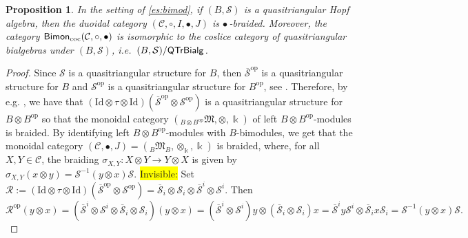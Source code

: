 \documentclass[nosumlimits,twoside]{amsart}
\newtheorem{proposition}[proposition]{\sc Proposition}
\theoremstyle{definition}
\theoremstyle{remark}
\newenvironment{invisible}{{\noindent\sc \colorbox{yellow}{Invisible:}\;}\color{gray}}{\medskip}
\newcommand{\id}{\mathrm{Id}}
\newcommand{\Cc}{\mathcal{C}}
\newcommand{\mm}{\mathfrak{M}}
\newcommand{\Rr}{\mathcal{R}}
\newcommand{\Ss}{\mathcal{S}}
\newcommand{\ot}{\otimes}
\def\cBimon{{\sf Bimon}_{\mathrm{coc}}}
\def\QTrBialg{{\sf QTrBialg}}
\newcommand{\op}{\mathrm{op}}
\begin{document}
\begin{proposition}
\label{pro:bimoncoc}
In the setting of \cref{es:bimod}, if $(B,\Ss)$ is a quasitriangular Hopf algebra, then the duoidal category $(\mathcal{C}, \circ, I, \bullet, J)$ is $\bullet$\,-braided. Moreover, the category  $\cBimon(\Cc,\circ,\bullet)$ is isomorphic to the coslice category of quasitriangular bialgebras under $(B,\Ss)$, i.e.\ $(B,\Ss)/\QTrBialg$.  
\end{proposition}

\begin{proof}
Since $\Ss$ is a quasitriangular structure for $B$, then $\overline{\Ss}^\op$ is a quasitriangular structure for $B$ and $\Ss^\op$ is a quasitriangular structure for $B^\op$, see \cite[Exercise 2.1.3]{Majid-book}. Therefore, by e.g. \cite[Theorem 2.2]{Chen-quasi}, we have that $(\id\ot\tau\ot\id)(\overline{\Ss}^\op\ot\Ss^\op)$ is a quasitriangular structure for $B\ot B^\op$ so that the monoidal category $(_{B\ot B^\op}\mm,\ot,\Bbbk)$ of left $B\ot B^\op$-modules is braided. By identifying left $B\ot B^\op$-modules with $B$-bimodules, we get that the monoidal category $(\Cc,\bullet,J)=({}_B\mathfrak{M}_B,\ot_\Bbbk,\Bbbk)$ is braided, where, for all $X,Y\in\Cc$, the braiding  $\sigma_{X,Y}:X\ot Y\to Y\ot X$ is given by $\sigma_{X,Y}(x\ot y)=\Ss^{-1}(y \ot x)\Ss$.
\begin{invisible}
 Set $\Rr:=(\id\ot\tau\ot\id)(\overline{\Ss}^\op\ot\Ss^\op)
=\overline{\Ss}_i\ot\Ss_i\ot\overline{\Ss}^i\ot\Ss^i.$ 
Then $\Rr^\op(y\ot x)
=(\overline{\Ss}^i\ot\Ss^i\ot \overline{\Ss}_i\ot\Ss_i)(y\ot x)
=(\overline{\Ss}^i\ot\Ss^i)y\ot ( \overline{\Ss}_i\ot\Ss_i)x
=\overline{\Ss}^iy\Ss^i\ot  \overline{\Ss}_ix\Ss_i
=\Ss^{-1}(y\ot x)\Ss.$
\end{invisible}


\end{proof}
\end{document}
